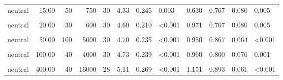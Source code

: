 \documentclass[
]{article}
\begin{document}
\begin{longtable}[t]{lrrrrrrlrrrl}
\hspace{1em}neutral & 15.00 & 50 & 750 & 30 & 4.33 & 0.245 & 0.003 & 0.630 & 0.767 & 0.080 & 0.005\\
\hspace{1em}\cellcolor{gray!10}{neutral} & \cellcolor{gray!10}{20.00} & \cellcolor{gray!10}{10} & \cellcolor{gray!10}{200} & \cellcolor{gray!10}{28} & \cellcolor{gray!10}{4.14} & \cellcolor{gray!10}{0.309} & \cellcolor{gray!10}{0.036} & \cellcolor{gray!10}{0.401} & \cellcolor{gray!10}{0.750} & \cellcolor{gray!10}{0.085} & \cellcolor{gray!10}{0.013}\\
\hspace{1em}neutral & 20.00 & 30 & 600 & 30 & 4.60 & 0.210 & <0.001 & 0.971 & 0.767 & 0.080 & 0.005\\
\hspace{1em}\cellcolor{gray!10}{neutral} & \cellcolor{gray!10}{50.00} & \cellcolor{gray!10}{10} & \cellcolor{gray!10}{500} & \cellcolor{gray!10}{28} & \cellcolor{gray!10}{4.36} & \cellcolor{gray!10}{0.258} & \cellcolor{gray!10}{0.003} & \cellcolor{gray!10}{0.640} & \cellcolor{gray!10}{0.857} & \cellcolor{gray!10}{0.069} & \cellcolor{gray!10}{<0.001}\\
\hspace{1em}neutral & 50.00 & 100 & 5000 & 30 & 4.70 & 0.235 & <0.001 & 0.950 & 0.867 & 0.064 & <0.001\\
\hspace{1em}\cellcolor{gray!10}{neutral} & \cellcolor{gray!10}{100.00} & \cellcolor{gray!10}{30} & \cellcolor{gray!10}{3000} & \cellcolor{gray!10}{28} & \cellcolor{gray!10}{4.46} & \cellcolor{gray!10}{0.280} & \cellcolor{gray!10}{0.003} & \cellcolor{gray!10}{0.664} & \cellcolor{gray!10}{0.786} & \cellcolor{gray!10}{0.080} & \cellcolor{gray!10}{0.004}\\
\hspace{1em}neutral & 100.00 & 40 & 4000 & 30 & 4.73 & 0.239 & <0.001 & 0.960 & 0.800 & 0.076 & 0.001\\
\hspace{1em}\cellcolor{gray!10}{neutral} & \cellcolor{gray!10}{400.00} & \cellcolor{gray!10}{10} & \cellcolor{gray!10}{4000} & \cellcolor{gray!10}{30} & \cellcolor{gray!10}{5.23} & \cellcolor{gray!10}{0.152} & \cellcolor{gray!10}{<0.001} & \cellcolor{gray!10}{2.121} & \cellcolor{gray!10}{0.967} & \cellcolor{gray!10}{0.034} & \cellcolor{gray!10}{<0.001}\\
\hspace{1em}neutral & 400.00 & 40 & 16000 & 28 & 5.11 & 0.269 & <0.001 & 1.151 & 0.893 & 0.061 & <0.001\\

\end{longtable}
\end{document}
